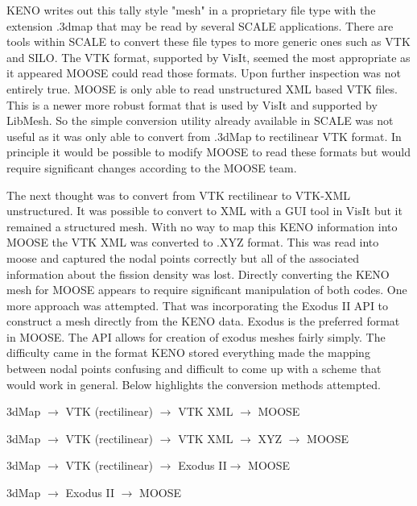 \documentclass[11pt]{article}
\begin{document}
KENO writes out this tally style "mesh" in a proprietary file type with the extension .3dmap that may be read by several SCALE applications.  There are tools within SCALE to convert these file types to more generic ones such as VTK and SILO.  The VTK format, supported by VisIt, seemed the most appropriate as it appeared MOOSE could read those formats.  Upon further inspection was not entirely true. MOOSE is only able to read unstructured XML based VTK files.  This is a newer more robust format that is used by VisIt and supported by LibMesh.  So the simple conversion utility already available in SCALE was not useful as it was only able to convert from .3dMap to rectilinear VTK format.  In principle it would be possible to modify MOOSE to read these formats but would require significant changes according to the MOOSE team.  

The next thought was to convert from VTK rectilinear to VTK-XML unstructured.  It was possible to convert to XML with a GUI tool in VisIt but it remained a structured mesh.  With no way to map this KENO information into MOOSE the VTK XML was converted to .XYZ format.  This was read into moose and captured the nodal points correctly but all of the associated information about the fission density was lost. Directly converting the KENO mesh for MOOSE appears to require significant manipulation of both codes.
	One more approach was attempted. That was incorporating the Exodus II API to construct a mesh directly from the KENO data.  Exodus is the preferred format in MOOSE.  The API allows for creation of exodus meshes fairly simply.  The difficulty came in the format KENO stored everything made the mapping between nodal points confusing and difficult to come up with a scheme that would work in general.  
Below highlights the conversion methods attempted.

3dMap $\rightarrow$ VTK (rectilinear) $\rightarrow$ VTK XML $\rightarrow$ MOOSE

3dMap $\rightarrow$ VTK (rectilinear) $\rightarrow$ VTK XML $\rightarrow$ XYZ $\rightarrow$ MOOSE

3dMap $\rightarrow$ VTK (rectilinear) $\rightarrow$ Exodus II$\rightarrow$ MOOSE

3dMap $\rightarrow$ Exodus II $\rightarrow$ MOOSE
\end{document}
